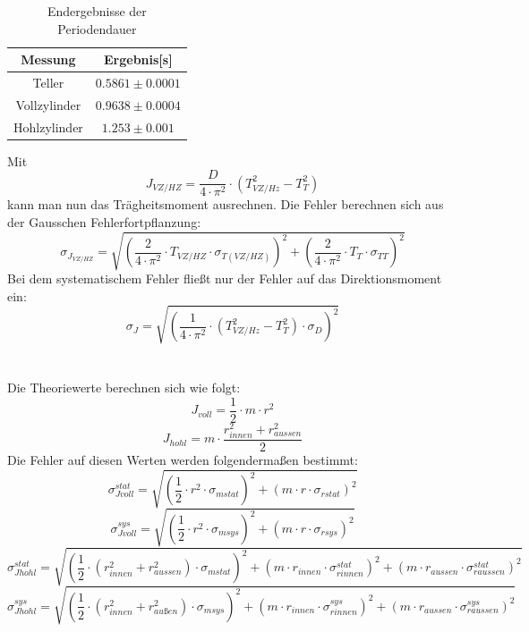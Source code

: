 \documentclass[12pt,a4paper]{article}
\begin{document}
\begin{table}[H]
\caption{Endergebnisse der Periodendauer}
\begin{center}
\begin{tabular}{|c|c|}
\hline
Messung &  Ergebnis[s]  \\
\hline
Teller &  $0.5861 \pm 0.0001$ \\
\hline
Vollzylinder &  $0.9638 \pm 0.0004$ \\
\hline
Hohlzylinder &  $1.253 \pm  0.001$ \\
\hline
\end{tabular}
\end{center}
\label{tab:Zylinder_Mittel}
\end{table}
Mit
\begin{equation}
J_{VZ/HZ} = \dfrac{D}{4\cdot \pi^{2}}\cdot (T_{VZ/Hz}^{2}-T_T^2)
\end{equation}
kann man nun das Trägheitsmoment ausrechnen. Die Fehler berechnen sich aus der Gausschen Fehlerfortpflanzung:
\begin{equation}
\sigma_{J_{VZ/HZ}} = \sqrt{(\dfrac{2}{4\cdot \pi^{2}}\cdot T_{VZ/HZ}\cdot \sigma_{T(VZ/HZ)})^2+ (\dfrac{2}{4\cdot \pi^{2}}\cdot T_{T}\cdot \sigma_{TT} )^2}
\end{equation}
Bei dem systematischem Fehler fließt nur der Fehler auf das Direktionsmoment ein:
\begin{equation}
\sigma_J = \sqrt{(\dfrac{1}{4\cdot \pi^{2}}\cdot (T_{VZ/Hz}^{2}-T_T^2)\cdot \sigma_D )^2}
\end{equation}\\
\\
Die Theoriewerte berechnen sich wie folgt:
\begin{equation}
J_{voll} = \dfrac{1}{2}\cdot m\cdot r^2
\end{equation}
\begin{equation}
J_{hohl} =m\cdot \dfrac{r_{innen}^2+r_{aussen}^2}{2}
\end{equation}
Die Fehler auf diesen Werten werden folgendermaßen bestimmt:
\begin{equation}
\sigma_{Jvoll}^{stat} = \sqrt{(\dfrac{1}{2}\cdot r^2\cdot \sigma_{mstat})^2+(m\cdot r\cdot \sigma_{rstat})^2}
\end{equation}
\begin{equation}
\sigma_{Jvoll}^{sys} = \sqrt{(\dfrac{1}{2}\cdot r^2\cdot \sigma_{msys})^2+(m\cdot r\cdot \sigma_{rsys})^2}
\end{equation}
\begin{equation}
\sigma_{Jhohl}^{stat} = \sqrt{(\dfrac{1}{2}\cdot(r_{innen}^2+r_{aussen}^2)\cdot \sigma_{mstat})^2+(m\cdot r_{innen}\cdot \sigma_{rinnen}^{stat})^2+(m\cdot r_{aussen}\cdot \sigma_{raussen}^{stat})^2}
\end{equation}
\begin{equation}
\sigma_{Jhohl}^{sys} = \sqrt{(\dfrac{1}{2}\cdot(r_{innen}^2+r_{außen}^2)\cdot \sigma_{msys})^2+(m\cdot r_{innen}\cdot \sigma_{rinnen}^{sys})^2+(m\cdot r_{aussen}\cdot \sigma_{raussen}^{sys})^2}
\end{equation}
\end{document}
